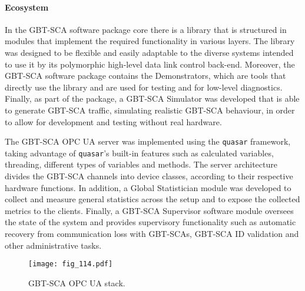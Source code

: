 \documentclass[cernpreprint, atlasdraft=false, UKenglish,british,orcidlogo, texmf, orcidlogo]{atlasdoc}
\begin{document}
 
\paragraph{    Ecosystem}
 
In the \gls{GBT-SCA} software package core there is a library that is structured in modules that implement the required functionality in various layers. The library was designed to be flexible and easily adaptable to the diverse systems intended to use it by its polymorphic high-level data link control back-end. Moreover, the \gls{GBT-SCA} software package contains the Demonstrators, which are tools that directly use the library and are used for testing and for low-level diagnostics. Finally, as part of the package, a \gls{GBT-SCA} Simulator was developed that is able to generate  \gls{GBT-SCA} traffic, simulating realistic  \gls{GBT-SCA} behaviour, in order to allow for development and testing without real hardware.
 
The \gls{GBT-SCA} \gls{OPC UA} server was implemented using the \texttt{\gls{quasar}} framework, taking advantage of \texttt{\gls{quasar}}'s built-in features such as calculated variables, threading, different types of variables and methods. The server architecture divides the  \gls{GBT-SCA} channels into device classes, according to their respective hardware functions. In addition, a Global Statistician module was developed to collect and measure general statistics across the setup and to expose the collected metrics to the clients. Finally, a \gls{GBT-SCA} Supervisor software module oversees the state of the system and provides supervisory functionality such as automatic recovery from communication loss with \glspl{GBT-SCA},  \gls{GBT-SCA} ID validation and other administrative tasks.
 
\begin{figure}[!htb]
\centering
\texttt{[image: fig\_114.pdf]}
\caption{\gls{GBT-SCA} \gls{OPC UA} stack.}
\label{fig:scaopcua-stack}
\end{figure}
 
\end{document}
